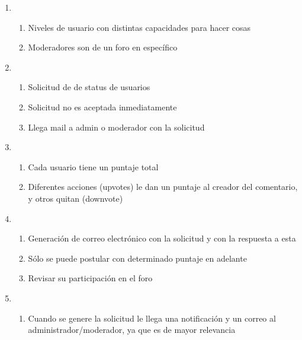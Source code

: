 \documentclass[12pt, letterpaper, notitlepage]{article}
\begin{document}
\begin{enumerate}
	\item {}
		\begin{enumerate}
			\item Niveles de usuario con distintas capacidades para hacer cosas
			\item Moderadores son de un foro en específico
		\end{enumerate}
		
	\item {}
		\begin{enumerate}
			\item Solicitud de  de status de usuarios
			\item Solicitud no es aceptada inmediatamente
			\item Llega mail a admin o moderador con la solicitud
		\end{enumerate}
		
	\item {}
		\begin{enumerate}
			\item Cada usuario tiene un puntaje total
			\item Diferentes acciones (upvotes) le dan un puntaje al creador del comentario, y otros quitan (downvote)	
		\end{enumerate}
		
	\item {}
		\begin{enumerate}
			\item Generación de correo electrónico con la solicitud y con la respuesta a esta
			\item Sólo se puede postular con determinado puntaje en adelante
			\item Revisar su participación en el foro
		\end{enumerate}
		
	\item {}
		\begin{enumerate}
			\item Cuando se genere la solicitud le llega una notificación y un correo al administrador/moderador, ya que es de mayor relevancia
		\end{enumerate}
		

\end{enumerate}
\end{document}
